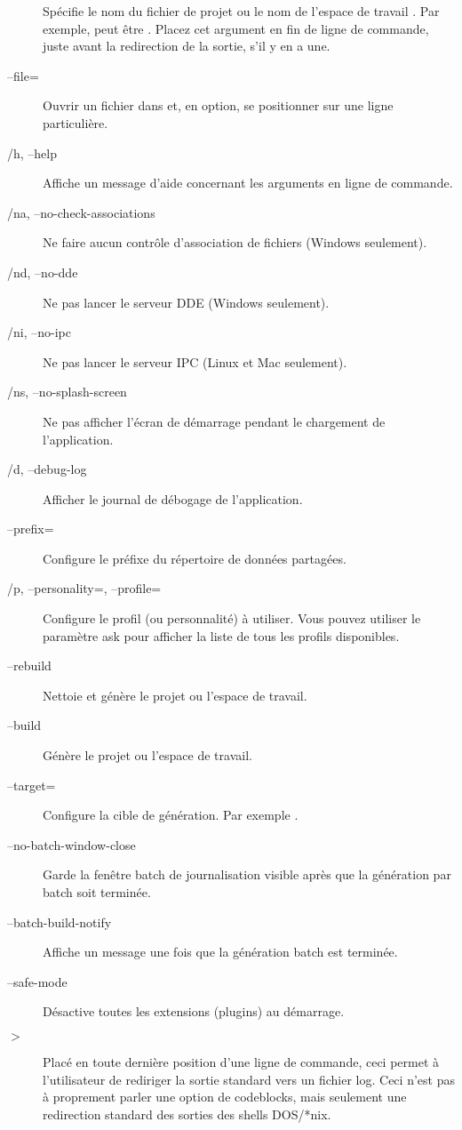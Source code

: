 \begin{description}
\item[] Spécifie le nom du fichier de projet  ou le nom de l'espace de travail . Par exemple,  peut être . Placez cet argument en fin de ligne de commande, juste avant la redirection de la sortie, s'il y en a une.
\item[--file=] Ouvrir un fichier dans \codeblocks et, en option, se positionner sur une ligne particulière.
\item[/h, --help] Affiche un message d'aide concernant les arguments en ligne de commande.
\item[/na, --no-check-associations] Ne faire aucun contrôle d'association de fichiers (Windows seulement).
\item[/nd, --no-dde] Ne pas lancer le serveur DDE (Windows seulement).
\item[/ni, --no-ipc] Ne pas lancer le serveur IPC (Linux et Mac seulement).
\item[/ns, --no-splash-screen] Ne pas afficher l'écran de démarrage pendant le chargement de l'application.
\item[/d, --debug-log] Afficher le journal de débogage de l'application.
\item[--prefix=] Configure le préfixe du répertoire de données partagées.
\item[/p, --personality=, --profile=] Configure le profil (ou personnalité) à utiliser. Vous pouvez utiliser le paramètre ask pour afficher la liste de tous les profils disponibles.
\item[--rebuild] Nettoie et génère le projet ou l'espace de travail.
\item[--build] Génère le projet ou l'espace de travail.
\item[--target=] Configure la cible de génération. Par exemple .
\item[--no-batch-window-close] Garde la fenêtre batch de journalisation visible après que la génération par batch soit terminée.
\item[--batch-build-notify] Affiche un message une fois que la génération batch est terminée.
\item[--safe-mode] Désactive toutes les extensions (plugins) au démarrage.
\item[$>$ ] Placé en toute dernière position d'une ligne de commande, ceci permet à l'utilisateur de rediriger la sortie standard vers un fichier log. Ceci n'est pas à proprement parler une option de codeblocks, mais seulement une redirection standard des sorties des shells DOS/*nix.
\end{description}

